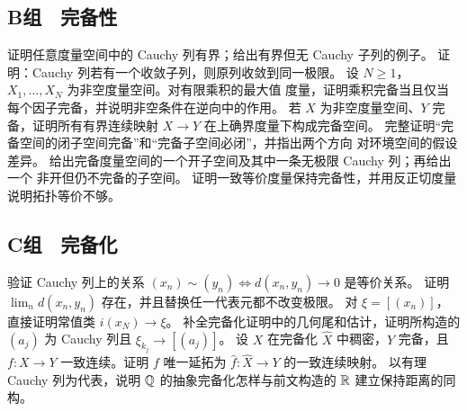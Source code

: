 \subsection*{B组　完备性}
\begin{enumerate}[label=\textbf{\thechapter.\arabic*.},resume]
 证明任意度量空间中的 Cauchy 列有界；给出有界但无 Cauchy 子列的例子。
 证明：Cauchy 列若有一个收敛子列，则原列收敛到同一极限。
 设 \(N\ge1\)，\(X_1,\ldots,X_N\) 为非空度量空间。对有限乘积的最大值
 度量，证明乘积完备当且仅当每个因子完备，并说明非空条件在逆向中的作用。
 若 \(X\) 为非空度量空间、\(Y\) 完备，证明所有有界连续映射
 \(X\to Y\) 在上确界度量下构成完备空间。
 完整证明“完备空间的闭子空间完备”和“完备子空间必闭”，并指出两个方向
 对环境空间的假设差异。
 给出完备度量空间的一个开子空间及其中一条无极限 Cauchy 列；再给出一个
 非开但仍不完备的子空间。
 证明一致等价度量保持完备性，并用反正切度量说明拓扑等价不够。
\end{enumerate}

\subsection*{C组　完备化}
\begin{enumerate}[label=\textbf{\thechapter.\arabic*.},resume]
 验证 Cauchy 列上的关系
 \((x_n)\sim(y_n)\iff d(x_n,y_n)\to0\) 是等价关系。
 证明 \(\lim_nd(x_n,y_n)\) 存在，并且替换任一代表元都不改变极限。
 对 \(\xi=[(x_n)]\)，直接证明常值类 \(i(x_N)\to\xi\)。
 补全完备化证明中的几何尾和估计，证明所构造的 \((a_j)\) 为 Cauchy 列且
 \(\xi_{k_j}\to[(a_j)]\)。
 设 \(X\) 在完备化 \(\widehat X\) 中稠密，\(Y\) 完备，且
 \(f:X\to Y\) 一致连续。证明 \(f\) 唯一延拓为
 \(\widehat f:\widehat X\to Y\) 的一致连续映射。
 以有理 Cauchy 列为代表，说明 \(\mathbb{Q}\) 的抽象完备化怎样与前文构造的
 \(\mathbb{R}\) 建立保持距离的同构。
\end{enumerate}
